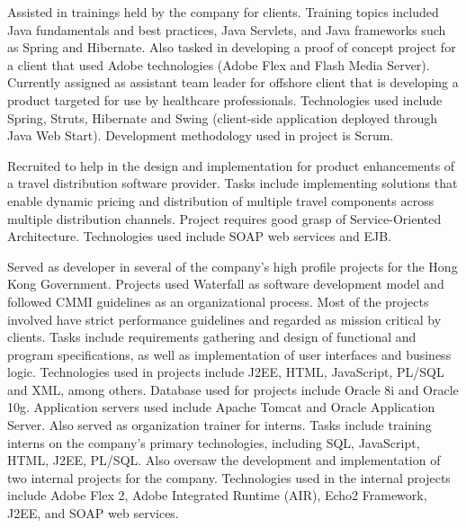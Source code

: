 \documentclass[11pt]{article}
\begin{document}
\begin{longtext}
Assisted in trainings held by the company for clients. Training topics included Java fundamentals
and best practices, Java Servlets, and Java frameworks such as Spring and Hibernate. Also tasked
in developing a proof of concept project for a client that used Adobe technologies (Adobe Flex
and Flash Media Server).
\shortskip
Currently assigned as assistant team leader for offshore client that is developing a product targeted for use
by healthcare professionals. Technologies used include Spring, Struts, Hibernate and Swing
(client-side application deployed through Java Web Start). Development methodology used in
project is Scrum.\\
\end{longtext}
\begin{longtext}
Recruited to help in the design and implementation for product enhancements of a travel
distribution software provider. Tasks include implementing solutions that enable dynamic pricing
and distribution of multiple travel components across multiple distribution channels. Project
requires good grasp of Service-Oriented Architecture. Technologies used include SOAP web
services and EJB.\\
\end{longtext}
\begin{longtext}
Served as developer in several of the company's high profile projects for the Hong Kong
Government. Projects used Waterfall as software development model and followed CMMI
guidelines as an organizational process. Most of the projects involved have strict performance
guidelines and regarded as mission critical by clients. Tasks include requirements gathering and
design of functional and program specifications, as well as implementation of user interfaces and
business logic. Technologies used in projects include J2EE, HTML, JavaScript, PL/SQL and
XML, among others. Database used for projects include Oracle 8i and Oracle 10g. Application
servers used include Apache Tomcat and Oracle Application Server.
\shortskip
Also served as organization trainer for interns. Tasks include training interns on the company's
primary technologies, including SQL, JavaScript, HTML, J2EE, PL/SQL. Also oversaw the development and implementation of two internal projects for the company. Technologies used in the internal projects include Adobe Flex 2, Adobe Integrated Runtime (AIR), Echo2 Framework,
J2EE, and SOAP web services.\\
\end{longtext}
\end{document}
